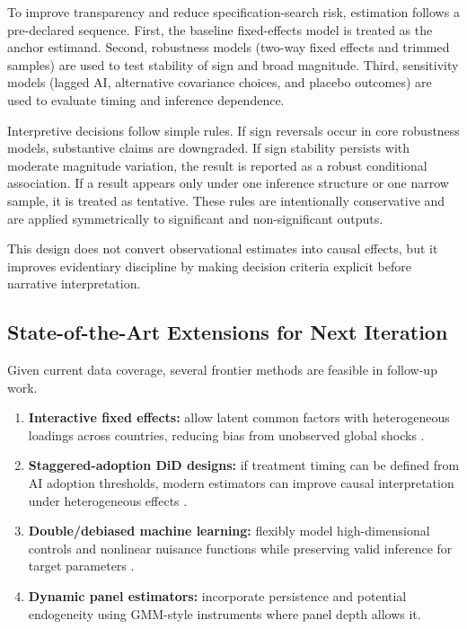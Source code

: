 To improve transparency and reduce specification-search risk, estimation follows a pre-declared sequence. First, the baseline fixed-effects model is treated as the anchor estimand. Second, robustness models (two-way fixed effects and trimmed samples) are used to test stability of sign and broad magnitude. Third, sensitivity models (lagged AI, alternative covariance choices, and placebo outcomes) are used to evaluate timing and inference dependence.

Interpretive decisions follow simple rules. If sign reversals occur in core robustness models, substantive claims are downgraded. If sign stability persists with moderate magnitude variation, the result is reported as a robust conditional association. If a result appears only under one inference structure or one narrow sample, it is treated as tentative. These rules are intentionally conservative and are applied symmetrically to significant and non-significant outputs.

This design does not convert observational estimates into causal effects, but it improves evidentiary discipline by making decision criteria explicit before narrative interpretation.

\subsection{State-of-the-Art Extensions for Next Iteration}

Given current data coverage, several frontier methods are feasible in follow-up work.

\begin{enumerate}
\item \textbf{Interactive fixed effects:} allow latent common factors with heterogeneous loadings across countries, reducing bias from unobserved global shocks \cite{bai2009}.
\item \textbf{Staggered-adoption DiD designs:} if treatment timing can be defined from AI adoption thresholds, modern estimators can improve causal interpretation under heterogeneous effects \cite{callaway2021}.
\item \textbf{Double/debiased machine learning:} flexibly model high-dimensional controls and nonlinear nuisance functions while preserving valid inference for target parameters \cite{chernozhukov2018}.
\item \textbf{Dynamic panel estimators:} incorporate persistence and potential endogeneity using GMM-style instruments where panel depth allows it.
\end{enumerate}
